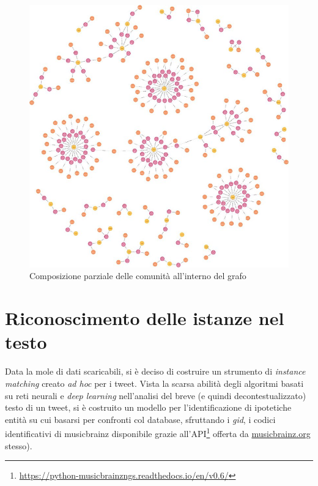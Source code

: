 \documentclass[12pt, a4paper, twocolumn]{article} %
\begin{document}
\begin{figure}
	\centering
	\includegraphics{big_graph.png}
	\caption{Composizione parziale delle comunità all'interno del grafo}
\end{figure}

\section{Riconoscimento delle istanze nel testo}
Data la mole di dati scaricabili, si è deciso di costruire un strumento di \textit{instance matching} creato \textit{ad hoc} per i tweet.
Vista la scarsa abilità degli algoritmi basati su reti neurali e \textit{deep learning} nell'analisi del breve (e quindi decontestualizzato) testo di un tweet, si è costruito un modello per l'identificazione di ipotetiche entità su cui basarsi per confronti col database, sfruttando i \textit{gid}, i codici identificativi di musicbrainz disponibile grazie all'API\footnote{\url{https://python-musicbrainzngs.readthedocs.io/en/v0.6/}} offerta da \url{musicbrainz.org} stesso).
\end{document}
